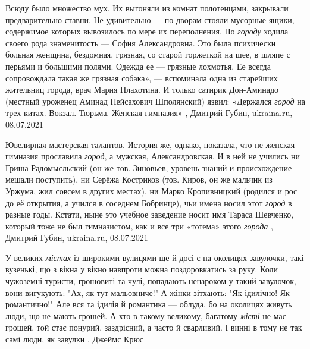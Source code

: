 Всюду было множество мух. Их выгоняли из комнат полотенцами, закрывали
предварительно ставни. Не удивительно — по дворам стояли мусорные ящики,
содержимое которых вывозилось по мере их переполнения.  По \emph{городу} ходила своего
рода знаменитость — София Александровна. Это была психически больная женщина,
бездомная, грязная, со старой горжеткой на шее, в шляпе с перьями и большими
полями. Одежда ее — грязные лохмотья. Ее всегда сопровождала такая же грязная
собака», — вспоминала одна из старейших жительниц города, врач Мария Плахотина.
И только сатирик Дон-Аминадо (местный уроженец Аминад Пейсахович Шполянский)
язвил: «Держался \emph{город} на трех китах. Вокзал. Тюрьма. Женская гимназия»
, Дмитрий Губин, ukraina.ru, 08.07.2021

Ювелирная мастерская талантов.
История же, однако, показала, что не женская гимназия прославила \emph{город}, а
мужская, Александровская. И в ней не учились ни Гриша Радомысльский (он же тов.
Зиновьев, уровень знаний и происхождение мешали поступить), ни Серёжа Костриков
(тов. Киров, он же мальчик из Уржума, жил совсем в других местах), ни Марко
Кропивницкий (родился и рос до её открытия, а учился в соседнем Бобринце), чьи
имена носил этот \emph{город} в разные годы. Кстати, ныне это учебное заведение носит
имя Тараса Шевченко, который тоже не был гимназистом, как и все три «тотема»
этого \emph{города}
, Дмитрий Губин, ukraina.ru, 08.07.2021

У великих \emph{містах} із широкими вулицями ще й досі є на околицях завулочки, такі
вузенькі, що з вікна у вікно навпроти можна поздоровкатись за руку. Коли
чужоземні туристи, грошовиті та чулі, попадають ненароком у такий завулочок,
вони вигукують: "Ах, як тут мальовниче!" А жінки зітхають: "Як ідилічно! Як
романтично!" Але вся та ідилія й романтика — облуда, бо на околицях живуть
люди, що не мають грошей. А хто в такому великому, багатому \emph{місті} не має
грошей, той стає понурий, заздрісний, а часто й сварливий. І винні в тому не
так самі люди, як завулки
, Джеймс Крюс
